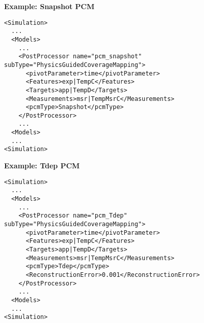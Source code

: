 \textbf{Example: Snapshot PCM}
\begin{lstlisting}[style=XML,morekeywords={subType}]
<Simulation>
  ...
  <Models>
    ...
    <PostProcessor name="pcm_snapshot" subType="PhysicsGuidedCoverageMapping">
      <pivotParameter>time</pivotParameter>
      <Features>exp|TempC</Features>
      <Targets>app|TempD</Targets>
      <Measurements>msr|TempMsrC</Measurements>
      <pcmType>Snapshot</pcmType>
    </PostProcessor>
    ...
  <Models>
  ...
<Simulation>
\end{lstlisting}

\textbf{Example: Tdep PCM}
\begin{lstlisting}[style=XML,morekeywords={subType}]
<Simulation>
  ...
  <Models>
    ...
    <PostProcessor name="pcm_Tdep" subType="PhysicsGuidedCoverageMapping">
      <pivotParameter>time</pivotParameter>
      <Features>exp|TempC</Features>
      <Targets>app|TempD</Targets>
      <Measurements>msr|TempMsrC</Measurements>
      <pcmType>Tdep</pcmType>
      <ReconstructionError>0.001</ReconstructionError>
    </PostProcessor>
    ...
  <Models>
  ...
<Simulation>
\end{lstlisting}
